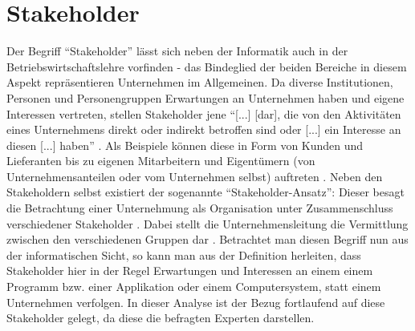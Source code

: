 \section{Stakeholder}
Der Begriff \enquote{Stakeholder} lässt sich neben der Informatik auch in der Betriebswirtschaftslehre vorfinden - das Bindeglied der beiden Bereiche in diesem Aspekt repräsentieren Unternehmen im Allgemeinen.
Da diverse Institutionen, Personen und Personengruppen Erwartungen an Unternehmen haben und eigene Interessen vertreten, stellen Stakeholder jene \enquote{[...] [dar], die von den Aktivitäten eines Unternehmens 
direkt oder indirekt betroffen sind oder [...] ein Interesse an diesen [...] haben} \cite{Fleig:2016aa}. Als Beispiele können diese in Form von Kunden und Lieferanten bis zu eigenen Mitarbeitern und Eigentümern (von 
Unternehmensanteilen oder vom Unternehmen selbst) auftreten \cite{Fleig:2016aa}. \newline Neben den Stakeholdern selbst existiert der sogenannte \enquote{Stakeholder-Ansatz}: Dieser besagt die Betrachtung einer Unternehmung
als Organisation unter Zusammenschluss verschiedener Stakeholder \cite{Seyfriedt:2018aa}. Dabei stellt die Unternehmensleitung die Vermittlung zwischen den verschiedenen Gruppen dar \cite{Seyfriedt:2018aa}. \newline
Betrachtet man diesen Begriff nun aus der informatischen Sicht, so kann man aus der Definition herleiten, dass Stakeholder hier in der Regel Erwartungen und Interessen an einem einem Programm bzw. einer Applikation oder einem 
Computersystem, statt einem Unternehmen verfolgen. \newline In dieser Analyse ist der Bezug fortlaufend auf diese Stakeholder gelegt, da diese die befragten Experten darstellen.

